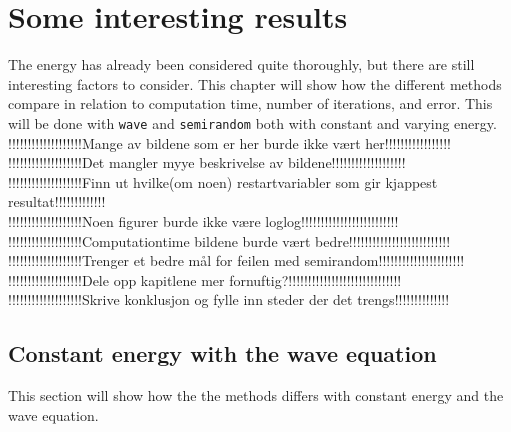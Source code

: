 \chapter{Some interesting results}
The energy has already been considered quite thoroughly, but there are still interesting factors to consider. This chapter will show how the different methods compare in relation to computation time, number of iterations, and error. This will be done with  \texttt{wave} and \texttt{semirandom} both with constant and varying energy.\\

!!!!!!!!!!!!!!!!!!!Mange av bildene som er her burde ikke vært her!!!!!!!!!!!!!!!!!\\
!!!!!!!!!!!!!!!!!!!Det mangler myye beskrivelse av bildene!!!!!!!!!!!!!!!!!!!\\
!!!!!!!!!!!!!!!!!!!Finn ut hvilke(om noen) restartvariabler som gir kjappest resultat!!!!!!!!!!!!!\\
!!!!!!!!!!!!!!!!!!!Noen figurer burde ikke være loglog!!!!!!!!!!!!!!!!!!!!!!!!!\\
!!!!!!!!!!!!!!!!!!!Computationtime bildene burde vært bedre!!!!!!!!!!!!!!!!!!!!!!!!!!\\
!!!!!!!!!!!!!!!!!!!Trenger et bedre mål for feilen med semirandom!!!!!!!!!!!!!!!!!!!!!!\\
!!!!!!!!!!!!!!!!!!!Dele opp kapitlene mer fornuftig?!!!!!!!!!!!!!!!!!!!!!!!!!!!!!\\
!!!!!!!!!!!!!!!!!!!Skrive konklusjon og fylle inn steder der det trengs!!!!!!!!!!!!!!\\



\section{Constant energy with the wave equation}
This section will show how the the methods differs with constant energy and the wave equation.



